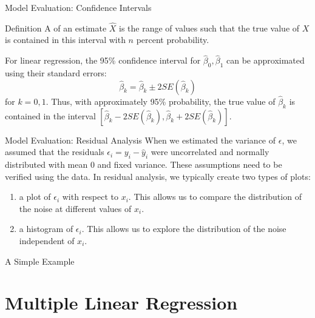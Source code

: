 \documentclass[12pt,t]{beamer}
\let\emph\relax %
\begin{document}
\begin{frame}{Model Evaluation: Confidence Intervals}
\vskip-0.4cm
\begin{block}{Definition}
A \emph{$n\%$ confidence interval} of an estimate $\widehat{X}$ is the range of values such that the true value of $X$ is contained in this interval with $n$ percent probability. 
\end{block}
\vskip0.2cm
For linear regression, the 95\% confidence interval for $\widehat{\beta}_0, \widehat{\beta}_1$ can be approximated using their standard errors:
\[
\widehat{\beta}_k = \widehat{\beta}_k \pm 2SE\left(\widehat{\beta}_k \right)
\]
for $k = 0, 1$. Thus, with approximately 95\% probability, the true value of $\widehat{\beta}_k$ is contained in the interval $\left[\widehat{\beta}_k - 2SE\left(\widehat{\beta}_k \right), \widehat{\beta}_k + 2SE\left(\widehat{\beta}_k \right)\right]$.
\end{frame}

\begin{frame}{Model Evaluation: Residual Analysis}
\vskip-0.4cm
When we estimated the variance of $\epsilon$, we assumed that the residuals $\epsilon_i = y_i - \widehat{y}_i$ were uncorrelated and normally distributed with mean 0 and fixed variance.
\vskip0.2cm
These assumptions need to be verified using the data. In residual analysis, we typically create two types of plots:
\begin{enumerate}
\item a plot of $\epsilon_i$ with respect to $x_i$. This allows us to compare the distribution of the noise at different values of $x_i$.
\item a histogram of $\epsilon_i$. This allows us to explore the distribution of the noise independent of $x_i$. 
\end{enumerate}
\end{frame}

\begin{frame}{A Simple Example}

\end{frame}


\section{Multiple Linear Regression}
\end{document}

